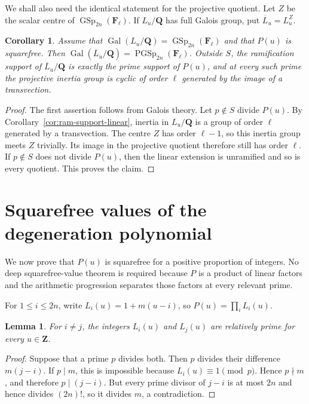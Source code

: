 \documentclass[11pt,hidelinks]{amsart}
\newtheorem{lemma}[theorem]{Lemma}
\newtheorem{corollary}[theorem]{Corollary}
\newcommand{\Q}{\mathbf Q}
\newcommand{\Z}{\mathbf Z}
\newcommand{\F}{\mathbf F}
\newcommand{\Gal}{\operatorname{Gal}}
\newcommand{\GSp}{\operatorname{GSp}}
\newcommand{\PGSp}{\operatorname{PGSp}}
\begin{document}
We shall also need the identical statement for the projective quotient. Let $Z$ be the scalar centre of $\GSp_{2n}(\F_\ell)$. If $L_u/\Q$ has full Galois group, put $\overline L_u=L_u^Z$.

\begin{corollary}\label{cor:ram-support-projective}
Assume that $\Gal(L_u/\Q)=\GSp_{2n}(\F_\ell)$ and that $P(u)$ is squarefree. Then
$\Gal(\overline L_u/\Q)=\PGSp_{2n}(\F_\ell)$. Outside $S$, the ramification support of $\overline L_u/\Q$ is exactly the prime support of $P(u)$, and at every such prime the projective inertia group is cyclic of order $\ell$ generated by the image of a transvection.
\end{corollary}

\begin{proof}
The first assertion follows from Galois theory. Let $p\notin S$ divide $P(u)$. By Corollary~\ref{cor:ram-support-linear}, inertia in $L_u/\Q$ is a group of order $\ell$ generated by a transvection. The centre $Z$ has order $\ell-1$, so this inertia group meets $Z$ trivially. Its image in the projective quotient therefore still has order $\ell$. If $p\notin S$ does not divide $P(u)$, then the linear extension is unramified and so is every quotient. This proves the claim.
\end{proof}

\section{Squarefree values of the degeneration polynomial}\label{sec:sieve}

We now prove that $P(u)$ is squarefree for a positive proportion of integers. No deep squarefree-value theorem is required because $P$ is a product of linear factors and the arithmetic progression separates those factors at every relevant prime.

For $1\leq i\leq2n$, write $L_i(u)=1+m(u-i)$, so $P(u)=\prod_iL_i(u)$.

\begin{lemma}\label{lem:linear-coprime}
For $i\neq j$, the integers $L_i(u)$ and $L_j(u)$ are relatively prime for every $u\in\Z$.
\end{lemma}

\begin{proof}
Suppose that a prime $p$ divides both. Then $p$ divides their difference $m(j-i)$. If $p\mid m$, this is impossible because $L_i(u)\equiv1\pmod p$. Hence $p\nmid m$, and therefore $p\mid(j-i)$. But every prime divisor of $j-i$ is at most $2n$ and hence divides $(2n)!$, so it divides $m$, a contradiction.
\end{proof}
\end{document}
